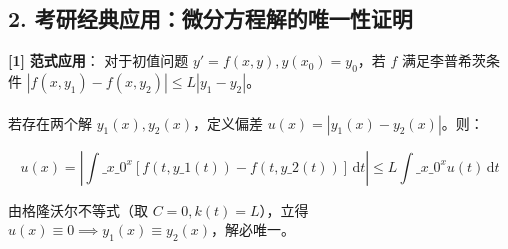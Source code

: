 \documentclass[11pt,a4paper,UTF8]{ctexart}
\begin{document}
\subsection{2. 考研经典应用：微分方程解的唯一性证明}
\begin{solbox}[分步推导与答题规范]
\textbf{[1]}  \textbf{范式应用}：
对于初值问题 $y' = f(x, y), y(x_0) = y_0$，若 $f$ 满足李普希茨条件 $|f(x, y_1) - f(x, y_2)| \le L |y_1 - y_2|$。\\ \\
若存在两个解 $y_1(x), y_2(x)$，定义偏差 $u(x) = |y_1(x) - y_2(x)|$。则：

\begin{equation*}
u(x) = \left| \int\_{x\_0}^x [f(t, y\_1(t)) - f(t, y\_2(t))]\,\mathrm{d}t \right| \le L \int\_{x\_0}^x u(t)\,\mathrm{d}t
\end{equation*}

由格隆沃尔不等式（取 $C = 0, k(t) = L$），立得 $u(x) \equiv 0 \implies y_1(x) \equiv y_2(x)$，解必唯一。
\end{solbox}
\end{document}
